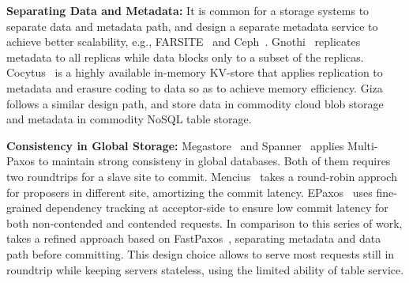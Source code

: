 
{\bf Separating Data and Metadata:}
It is common for a storage systems to separate data and metadata path, and design a separate metadata service to achieve better scalability, e.g., FARSITE~\cite{adya2002farsite} and Ceph~\cite{weil2006ceph}. Gnothi~\cite{wang2012gnothi} replicates metadata to all replicas while data blocks only to a subset of the replicas. Cocytus~\cite{zhang2016efficient} is a highly available in-memory KV-store that applies replication to metadata and erasure coding to data so as to achieve memory efficiency.
Giza follows a similar design path, and store data in commodity cloud blob storage and metadata in commodity NoSQL table storage.

{\bf Consistency in Global Storage:}
Megastore~\cite{megastore} and Spanner~\cite{Spanner} applies Multi-Paxos to 
maintain strong consisteny in global databases. Both of them requires two roundtrips 
for a slave site to commit. Mencius~\cite{Mencius} takes a round-robin approch for 
proposers in different site, amortizing the commit latency. EPaxos~\cite{EPaxos} 
uses fine-grained dependency tracking at acceptor-side to ensure low commit latency 
for both non-contended and contended requests. In comparison to this series of work, 
\name takes a refined approach based on FastPaxos~\cite{fastpaxos}, separating metadata 
and data path before committing. This design choice allows \name to serve most requests 
still in roundtrip while keeping servers stateless, using the limited ability of 
table service. 


